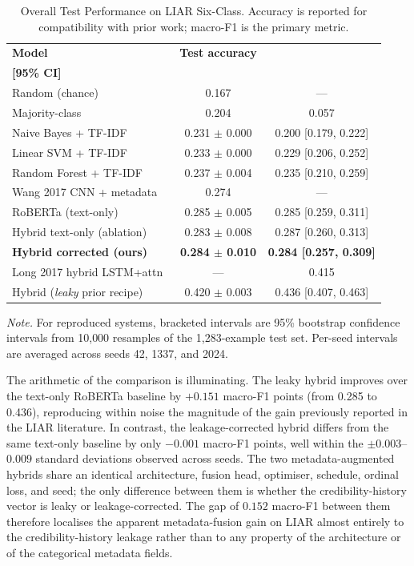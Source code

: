 \documentclass[journal]{IEEEtran}
\begin{document}
\begin{table}[t]
\centering
\caption{Overall Test Performance on LIAR Six-Class. Accuracy is reported for compatibility with prior work; macro-F1 is the primary metric.}
\label{tab:overall}
\scriptsize
\setlength{\tabcolsep}{2pt}
\begin{tabular}{@{}lcc@{}}
\toprule
\textbf{Model} & \textbf{Test accuracy} & \shortstack{\textbf{Test macro-F1}\\\textbf{[95\% CI]}} \\
\midrule
Random (chance) & 0.167 & --- \\
Majority-class & 0.204 & 0.057 \\
Naive Bayes + TF-IDF & 0.231 $\pm$ 0.000 & 0.200 [0.179, 0.222] \\
Linear SVM + TF-IDF & 0.233 $\pm$ 0.000 & 0.229 [0.206, 0.252] \\
Random Forest + TF-IDF & 0.237 $\pm$ 0.004 & 0.235 [0.210, 0.259] \\
Wang 2017 CNN + metadata~\cite{wang2017liar} & 0.274 & --- \\
RoBERTa (text-only) & 0.285 $\pm$ 0.005 & 0.285 [0.259, 0.311] \\
Hybrid text-only (ablation) & 0.283 $\pm$ 0.008 & 0.287 [0.260, 0.313] \\
\textbf{Hybrid corrected (ours)} & \textbf{0.284 $\pm$ 0.010} & \textbf{0.284 [0.257, 0.309]} \\
Long 2017 hybrid LSTM+attn~\cite{long2017fakenews} & --- & 0.415 \\
Hybrid (\emph{leaky} prior recipe) & 0.420 $\pm$ 0.003 & 0.436 [0.407, 0.463] \\
\bottomrule
\end{tabular}
\vspace{2pt}
\parbox{0.96\columnwidth}{\scriptsize \emph{Note.} For reproduced systems, bracketed intervals are 95\% bootstrap confidence intervals from 10{,}000 resamples of the 1{,}283-example test set. Per-seed intervals are averaged across seeds 42, 1337, and 2024.}
\end{table}

The arithmetic of the comparison is illuminating. The leaky hybrid improves over the text-only RoBERTa baseline by $+0.151$ macro-F1 points (from 0.285 to 0.436), reproducing within noise the magnitude of the gain previously reported in the LIAR literature. In contrast, the leakage-corrected hybrid differs from the same text-only baseline by only $-0.001$ macro-F1 points, well within the $\pm 0.003$--$0.009$ standard deviations observed across seeds. The two metadata-augmented hybrids share an identical architecture, fusion head, optimiser, schedule, ordinal loss, and seed; the only difference between them is whether the credibility-history vector is leaky or leakage-corrected. The gap of $0.152$ macro-F1 between them therefore localises the apparent metadata-fusion gain on LIAR almost entirely to the credibility-history leakage rather than to any property of the architecture or of the categorical metadata fields.
\end{document}
